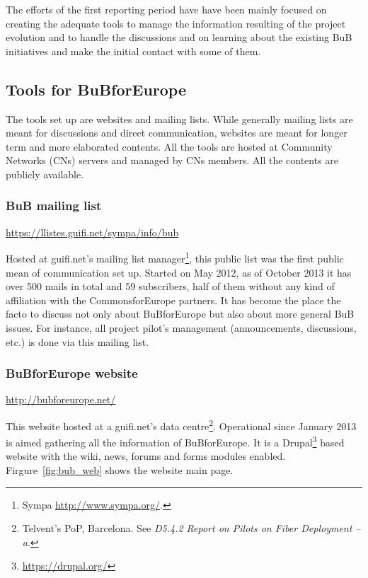 The efforts of the first reporting period have have been mainly focused on creating the adequate tools to manage the information resulting of the project evolution and to handle the discussions and on learning about the existing BuB initiatives and make the initial contact with some of them.

\subsection{Tools for BuBforEurope}
\label{tools}

The tools set up are websites and mailing lists. While generally mailing lists are meant for discussions and direct communication, websites are meant for longer term and more elaborated contents. All the tools are hosted at Community Networks (CNs) servers and managed by CNs members. All the contents are publicly available.

\subsubsection{BuB mailing list}

\url{https://llistes.guifi.net/sympa/info/bub}

Hosted at guifi.net's mailing list manager\footnote{Sympa \url{http://www.sympa.org/}.}, this public list was the first public mean of communication set up. Started on May 2012, as of October 2013 it has over 500 mails in total and 59 subscribers, half of them without any kind of affiliation with the CommonsforEurope partners. It has become the place the facto to discuss not only about BuBforEurope but also about more general BuB issues. For instance, all project pilot's management (announcements, discussions, etc.) is done via this mailing list.


\subsubsection{BuBforEurope website}

\url{http://bubforeurope.net/}

This website hosted at a guifi.net's data centre\footnote{Telvent's PoP, Barcelona. See \emph{D5.4.2 Report on Pilots on Fiber Deployment -- a}.}. Operational since January 2013 is aimed gathering all the information of BuBforEurope. It is a Drupal\footnote{\url{https://drupal.org/}} based website with the wiki, news, forums and forms modules enabled. Firgure~\ref{fig:bub_web} shows the website main page.

